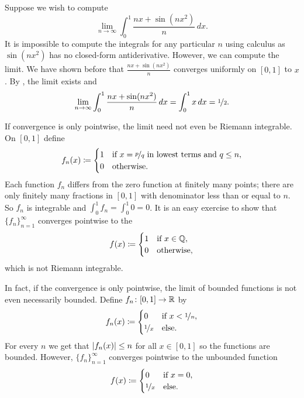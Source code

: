 \begin{example}
Suppose we wish to compute
\begin{equation*}
\lim_{n\to\infty} \int_0^1 \frac{nx+ \sin(nx^2)}{n} \,dx .
\end{equation*}
It is impossible to compute the integrals for any particular $n$ using 
calculus as $\sin(nx^2)$ has no closed-form antiderivative.  However,
we can compute the limit.
We have shown before that $\frac{nx+ \sin(nx^2)}{n}$ converges uniformly
on $[0,1]$ to $x$.
By , the limit exists and
\begin{equation*}
\lim_{n\to\infty} \int_0^1 \frac{nx+ \sin(nx^2)}{n} \,dx
=
\int_0^1
x \,dx = \nicefrac{1}{2} .
\end{equation*}
\end{example}

\begin{example}
If convergence is only pointwise, the limit need not even be Riemann
integrable.  On $[0,1]$ define
\begin{equation*}
f_n(x) \coloneqq
\begin{cases}
1 & \text{if } x = \nicefrac{p}{q} \text{ in lowest terms and } q \leq n, \\
0 & \text{otherwise.}
\end{cases}
\end{equation*}
Each function $f_n$ differs from the zero function at finitely many points;
there are only finitely many fractions in $[0,1]$ with denominator less than
or equal to $n$.   So $f_n$ is integrable and $\int_0^1 f_n = \int_0^1 0 =
0$.  It is an easy exercise to show that $\{ f_n \}_{n=1}^\infty$ converges pointwise to the
\begin{equation*}
f(x) \coloneqq
\begin{cases}
1 & \text{if } x \in {\mathbb{Q}}, \\
0 & \text{otherwise,}
\end{cases}
\end{equation*}
which is not Riemann integrable.
\end{example}

\begin{example}
In fact, if the convergence is only pointwise, the limit of bounded
functions is not even necessarily bounded.
Define $f_n \colon [0,1] \to {\mathbb{R}}$ by
\begin{equation*}
f_n(x) \coloneqq
\begin{cases}
0 & \text{if } x < \nicefrac{1}{n},\\
\nicefrac{1}{x} & \text{else.}
\end{cases}
\end{equation*}
For every $n$ we get that $\left\lvert {f_n(x)} \right\rvert \leq n$ for all $x \in [0,1]$ so the
functions are bounded.  However, $\{ f_n \}_{n=1}^\infty$ converges pointwise to
the unbounded function
\begin{equation*}
f(x) \coloneqq
\begin{cases}
0 & \text{if } x = 0,\\
\nicefrac{1}{x} & \text{else.}
\end{cases}
\end{equation*}
\end{example}


